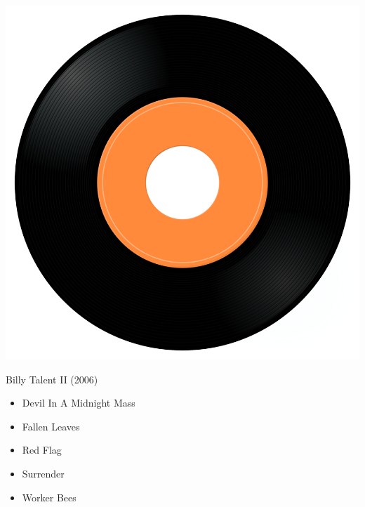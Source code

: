 \begin{minipage}[t]{0.25\textwidth}
\captionsetup{type=figure}
\includegraphics[width=\textwidth]{Images/cover.png}
\caption*{Billy Talent II (2006)}
\end{minipage}
\begin{minipage}[t]{0.25\textwidth}\vspace{0pt}
\begin{itemize}[nosep,leftmargin=1em,labelwidth=*,align=left]
	\setlength{\itemsep}{0pt}
	\item Devil In A Midnight Mass
	\item Fallen Leaves
	\item Red Flag
	\item Surrender 
	\item Worker Bees
\end{itemize}
\end{minipage}
